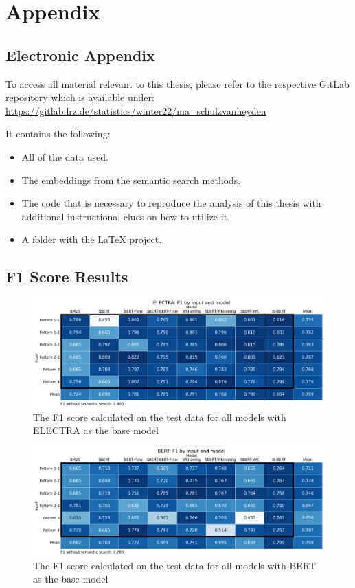 \chapter{Appendix}

\section{Electronic Appendix}

To access all material relevant to this thesis, please refer to the respective GitLab repository which is available under: \url{https://gitlab.lrz.de/statistics/winter22/ma_schulzvanheyden}

It contains the following:
\begin{itemize}
    \item All of the data used.
    \item The embeddings from the semantic search methods.
    \item The code that is necessary to reproduce the analysis of this thesis with additional instructional clues on how to utilize it.
    \item A folder with the LaTeX project.
\end{itemize}

\newpage

\section{F1 Score Results}\label{f1}

\begin{figure}[h]
\centering
\includegraphics[width = 1\linewidth]{figures/electra_f1.png}
\caption{The F1 score calculated on the test data for all models with ELECTRA as the base model}
\label{fig:electra_f1}
\end{figure}

\begin{figure}[h]
\centering
\includegraphics[width = 1\linewidth]{figures/bert_f1.png}
\caption{The F1 score calculated on the test data for all models with BERT as the base model}
\label{fig:bert_f1}
\end{figure}

